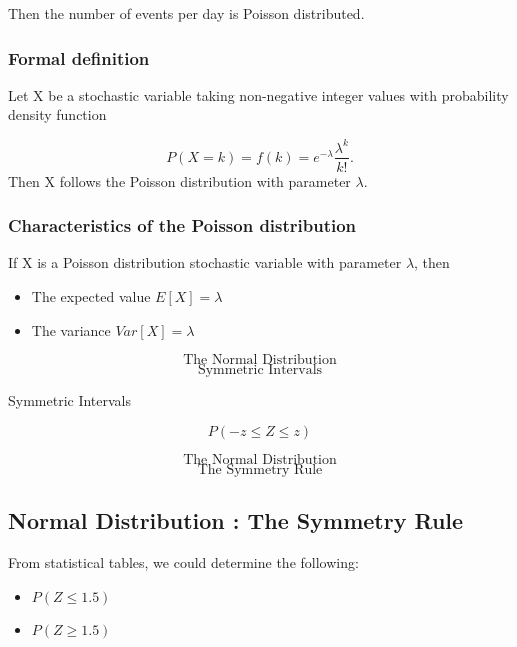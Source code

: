 \documentclass[12pt]{report}
\begin{document}
{{Then the number of events per day is Poisson distributed.

\subsubsection{Formal definition}

Let X be a stochastic variable taking non-negative integer values with probability density function

\[ P(X=k)=f(k)= e^{-\lambda} \frac{\lambda ^k}{k!}.\] 
Then X follows the Poisson distribution with parameter $\lambda$.

\subsubsection{Characteristics of the Poisson distribution}

If X is a Poisson distribution stochastic variable with parameter $\lambda$, then

\begin{itemize}
	\item The expected value $E[X]=\lambda$
	\item The variance $Var[X]=\lambda$
\end{itemize}





\huge
\[ \mbox{The Normal Distribution} \]
\Large
\[ \mbox{Symmetric Intervals} \]







Symmetric Intervals

\[ P( -z \leq Z \leq z) \]










\huge
\[ \mbox{The Normal Distribution} \]
\Large
\[ \mbox{The Symmetry Rule} \]





\subsection{Normal Distribution : The Symmetry Rule}
\Large
From statistical tables, we could determine the following:
\begin{itemize}
	\item $P(Z \leq 1.5) $
	\item $P(Z \geq 1.5) $
\end{itemize}


}}
\end{document}
